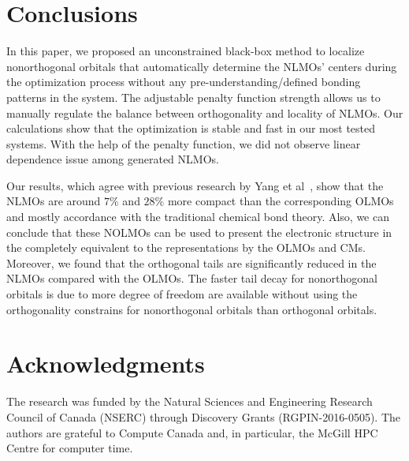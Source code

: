 \documentclass[aps,prl,reprint,amsmath,amssymb]{revtex4-1}
\begin{document}




\section{Conclusions}
In this paper, we proposed an unconstrained black-box method to localize nonorthogonal orbitals that automatically determine the NLMOs' centers during the optimization process without any pre-understanding/defined bonding patterns in the system. 
The adjustable penalty function strength allows us to manually regulate the balance between orthogonality and locality of NLMOs.
Our calculations show that the optimization is stable and fast in our most tested systems.
With the help of the penalty function, we did not observe linear dependence issue among generated NLMOs.

Our results, which agree with previous research by Yang et al~\cite{feng2004An_efficient, cui2010efficient}, show that the NLMOs are around $7\%$ and $28\%$ more compact than the corresponding OLMOs and mostly accordance with the traditional chemical bond theory.
Also, we  can conclude that these NOLMOs can be used to present the electronic structure in the completely equivalent to the representations by the OLMOs and CMs.
Moreover, we found that the orthogonal tails are significantly reduced in the NLMOs compared with the OLMOs.
The faster tail decay for nonorthogonal orbitals is due to more degree of freedom are available without using the orthogonality constrains for nonorthogonal orbitals than orthogonal orbitals.

\section{Acknowledgments} 

The research was funded by the Natural Sciences and Engineering Research Council of Canada (NSERC) through Discovery
Grants (RGPIN-2016-0505). The authors are grateful to Compute Canada and, in particular, the McGill HPC Centre for computer time.



\end{document}

